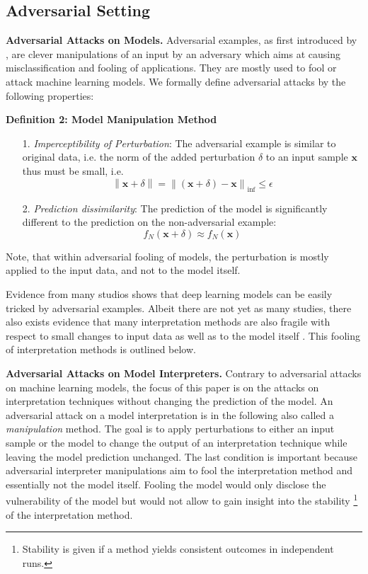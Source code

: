\documentclass[sigconf]{acmart}
\newcommand{\norm}[1]{\left\lVert#1\right\rVert}
\newcommand{\mypar}[1]{\vspace{0.2cm}\noindent\textbf{#1}}
\begin{document}
\subsection{Adversarial Setting}
\label{subsec:adversarial_setting}
\mypar{Adversarial Attacks on Models. }
Adversarial examples, as first introduced by \cite{szegedy_intriguing}, are clever manipulations of an input by an adversary which aims at causing misclassification and fooling of applications. They are mostly used to fool or attack machine learning models. We formally define adversarial attacks by the following properties: 
\par\smallskip
\textbf{Definition 2: Model Manipulation Method}
\begin{enumerate}
    \item[1.] \textit{Imperceptibility of Perturbation}: The adversarial example is similar to original data, i.e. the norm of the added perturbation $\delta$ to an input sample $\mathbf{x}$ thus must be small, i.e. $$\norm{\mathbf{x}+\delta} = \norm{(\mathbf{x}+\delta)-\mathbf{x}}_{\inf} \leq \epsilon$$
    \item[2.] \textit{Prediction dissimilarity}: The prediction of the model is significantly different to the prediction on the non-adversarial example: $$f_N(\mathbf{x}+\delta) \approx f_N(\mathbf{x})$$
\end{enumerate}
Note, that within adversarial fooling of models, the perturbation is mostly applied to the input data, and not to the model itself.

Evidence from many studios shows that deep learning models can be easily tricked by adversarial examples. 
Albeit there are not yet as many studies, there also exists evidence that many interpretation methods are also fragile with respect to small changes to input data \cite{adebayo2018sanity, samek2019explainable, alvarez2018towards} as well as to the model itself \cite{fooling_nn_interpreters, dimanov2020you}. This fooling of interpretation methods is outlined below. 

\mypar{Adversarial Attacks on Model Interpreters.} 
Contrary to adversarial attacks on machine learning models, the focus of this paper is on the attacks on interpretation techniques without changing the prediction of the model. 
An adversarial attack on a model interpretation is in the following also called a \textit{manipulation} method. 
The goal is to apply perturbations to either an input sample or the model to change the output of an interpretation technique while leaving the model prediction unchanged. The last condition is important because adversarial interpreter manipulations aim to fool the interpretation method and essentially not the model itself. 
Fooling the model would only disclose the vulnerability of the model but would not allow to gain insight into the stability \footnote{Stability is given if a method yields consistent outcomes in independent runs.} of the interpretation method.
\end{document}

